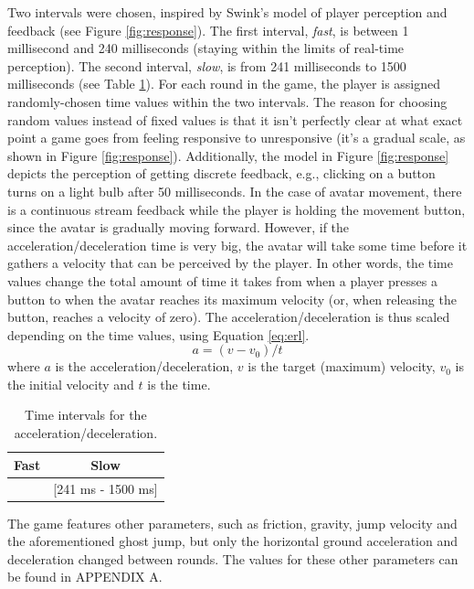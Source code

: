Two intervals were chosen, inspired by Swink's model of player perception and feedback (see Figure \ref{fig:response}). The first interval, \textit{fast}, is between 1 millisecond and 240 milliseconds (staying within the limits of real-time perception). The second interval, \textit{slow}, is from 241 milliseconds to 1500 milliseconds (see Table \ref{tab:time}). For each round in the game, the player is assigned randomly-chosen time values within the two intervals. The reason for choosing random values instead of fixed values is that it isn't perfectly clear at what exact point a game goes from feeling responsive to unresponsive (it's a gradual scale, as shown in Figure \ref{fig:response}). Additionally, the model in Figure \ref{fig:response} depicts the perception of getting discrete feedback, e.g., clicking on a button turns on a light bulb after 50 milliseconds. In the case of avatar movement, there is a continuous stream feedback while the player is holding the movement button, since the avatar is gradually moving forward. However, if the acceleration/deceleration time is very big, the avatar will take some time before it gathers a velocity that can be perceived by the player. In other words, the time values change the total amount of time it takes from when a player presses a button to when the avatar reaches its maximum velocity (or, when releasing the button, reaches a velocity of zero). The acceleration/deceleration is thus scaled depending on the time values, using Equation \ref{eq:erl}.
\begin{equation} \label{eq:erl} %
a = (v - v_0)/t
\end{equation} 
where $a$ is the acceleration/deceleration, $v$ is the target (maximum) velocity, $v_0$ is the initial velocity and $t$ is the time.

\begin{table}[htbp]
\small
\centering
\begin{tabular}{|c|c|}
\hline \textbf{Fast}
& \textbf{Slow}\\\hline
[1 ms - 240 ms]
& [241 ms - 1500 ms]
\\\hline
\end{tabular}
\caption{Time intervals for the acceleration/deceleration.}
\label{tab:time}
\end{table}

The game features other parameters, such as friction, gravity, jump velocity and the aforementioned ghost jump, but only the horizontal ground acceleration and deceleration changed between rounds. The values for these other parameters can be found in APPENDIX A.

